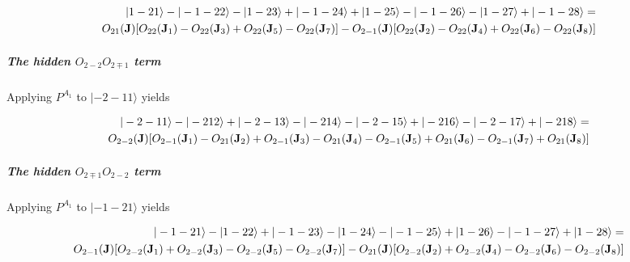 \begin{eqnarray}
|1-21\rangle-|-1-22\rangle-|1-23\rangle+|-1-24\rangle 
+|1-25\rangle-|-1-26\rangle-|1-27\rangle+|-1-28\rangle =&& \\ \nonumber
O_{21}(\mathbf J)[O_{22}(\mathbf J_1)-O_{22}(\mathbf J_3)+O_{22}(\mathbf J_5)-O_{22}(\mathbf J_7)]
-O_{2-1}(\mathbf J)[O_{22}(\mathbf J_2)-O_{22}(\mathbf J_4)+O_{22}(\mathbf J_6)-O_{22}(\mathbf J_8)]&&
\end{eqnarray}
 

\subparagraph{The hidden $O_{2-2}O_{2\mp1}$ term}

Applying $P^{A_1}$ to $|-2-11\rangle$ yields 

\begin{eqnarray}
|-2-11\rangle-|-212\rangle+|-2-13\rangle-|-214\rangle 
-|-2-15\rangle+|-216\rangle-|-2-17\rangle+|-218\rangle =&& \\ \nonumber
O_{2-2}(\mathbf J)[O_{2-1}(\mathbf J_1)-O_{21}(\mathbf J_2)+O_{2-1}(\mathbf J_3)-O_{21}(\mathbf J_4)
-O_{2-1}(\mathbf J_5)+O_{21}(\mathbf J_6)-O_{2-1}(\mathbf J_7)+O_{21}(\mathbf J_8)]&&
\end{eqnarray}
 

\subparagraph{The hidden $O_{2\mp1}O_{2-2}$ term}

Applying $P^{A_1}$ to $|-1-21\rangle$ yields 

\begin{eqnarray}
|-1-21\rangle-|1-22\rangle+|-1-23\rangle-|1-24\rangle 
-|-1-25\rangle+|1-26\rangle-|-1-27\rangle+|1-28\rangle =&&\\ \nonumber
O_{2-1}(\mathbf J)[O_{2-2}(\mathbf J_1)+O_{2-2}(\mathbf J_3)-O_{2-2}(\mathbf J_5)-O_{2-2}(\mathbf J_7)]
-O_{21}(\mathbf J)[O_{2-2}(\mathbf J_2)+O_{2-2}(\mathbf J_4)-O_{2-2}(\mathbf J_6)-O_{2-2}(\mathbf J_8)]&&
\end{eqnarray}
   


